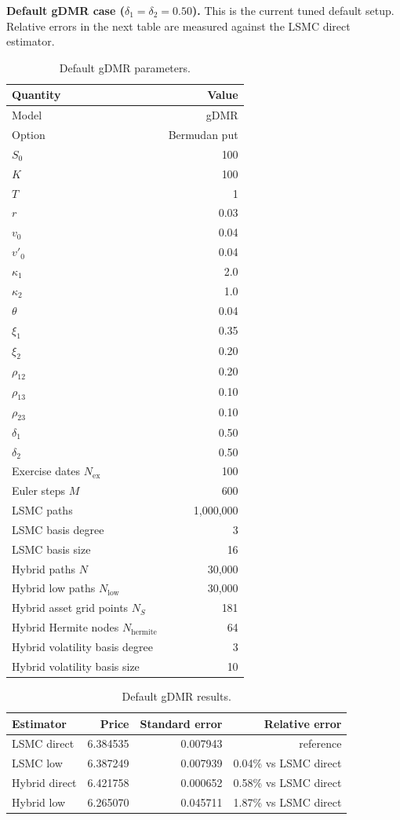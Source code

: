 \documentclass[11pt]{article}
\begin{document}
\textbf{Default gDMR case ($\delta_1=\delta_2=0.50$).} This is the current tuned default setup.
Relative errors in the next table are measured against the LSMC direct estimator.

\begin{table}[H]
\centering
\caption{Default gDMR parameters.}
\begin{tabular}{lr}
\toprule
Quantity & Value \\
\midrule
Model & gDMR \\
Option & Bermudan put \\
$S_0$ & 100 \\
$K$ & 100 \\
$T$ & 1 \\
$r$ & 0.03 \\
$v_0$ & 0.04 \\
$v'_0$ & 0.04 \\
$\kappa_1$ & 2.0 \\
$\kappa_2$ & 1.0 \\
$\theta$ & 0.04 \\
$\xi_1$ & 0.35 \\
$\xi_2$ & 0.20 \\
$\rho_{12}$ & 0.20 \\
$\rho_{13}$ & 0.10 \\
$\rho_{23}$ & 0.10 \\
$\delta_1$ & 0.50 \\
$\delta_2$ & 0.50 \\
Exercise dates $N_{\mathrm{ex}}$ & 100 \\
Euler steps $M$ & 600 \\
LSMC paths & 1,000,000 \\
LSMC basis degree & 3 \\
LSMC basis size & 16 \\
Hybrid paths $N$ & 30,000 \\
Hybrid low paths $N_{\mathrm{low}}$ & 30,000 \\
Hybrid asset grid points $N_S$ & 181 \\
Hybrid Hermite nodes $N_{\mathrm{hermite}}$ & 64 \\
Hybrid volatility basis degree & 3 \\
Hybrid volatility basis size & 10 \\
\bottomrule
\end{tabular}
\end{table}

\begin{table}[H]
\centering
\caption{Default gDMR results.}
\begin{tabular}{lrrr}
\toprule
Estimator & Price & Standard error & Relative error \\
\midrule
LSMC direct   & 6.384535 & 0.007943 & reference \\
LSMC low      & 6.387249 & 0.007939 & 0.04\% vs LSMC direct \\
Hybrid direct & 6.421758 & 0.000652 & 0.58\% vs LSMC direct \\
Hybrid low    & 6.265070 & 0.045711 & 1.87\% vs LSMC direct \\
\bottomrule
\end{tabular}
\end{table}
\end{document}

